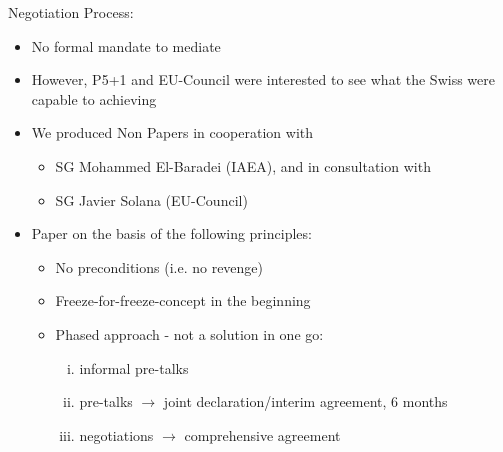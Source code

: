 Negotiation Process:

\begin{itemize}
    \item No formal mandate to mediate
    \item However, P5+1 and EU-Council were interested to see what the Swiss
        were capable to achieving
    \item We produced Non Papers in cooperation with
        \begin{itemize}
            \item SG Mohammed El-Baradei (IAEA), and in consultation with
            \item SG Javier Solana (EU-Council)
        \end{itemize}
    \item Paper on the basis of the following principles:
        \begin{itemize}
            \item No preconditions (i.e. no revenge)
            \item Freeze-for-freeze-concept in the beginning
            \item Phased approach - not a solution in one go:
                \begin{enumerate}[i)]
                    \item informal pre-talks
                    \item pre-talks $\rightarrow$ joint declaration/interim
                        agreement, 6 months
                    \item negotiations $\rightarrow$ comprehensive agreement
                \end{enumerate}
        \end{itemize}
\end{itemize}


